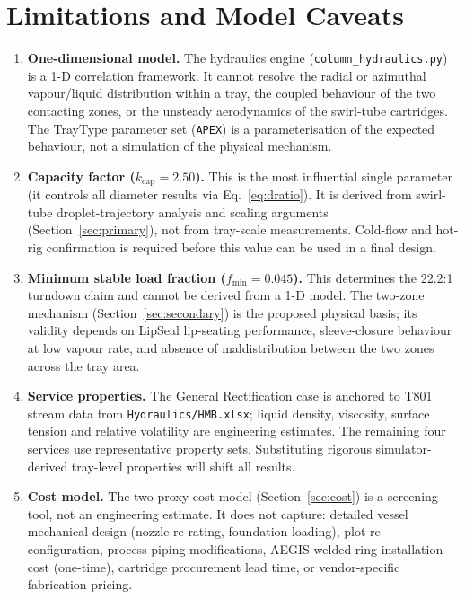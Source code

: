 \documentclass[11pt,letterpaper]{article}
\begin{document}
\section{Limitations and Model Caveats}
\label{sec:limitations}

\begin{enumerate}[nosep]
  \item \textbf{One-dimensional model.}
    The hydraulics engine (\texttt{column\_hydraulics.py}) is a 1-D correlation
    framework.  It cannot resolve the radial or azimuthal vapour/liquid
    distribution within a tray, the coupled behaviour of the two contacting
    zones, or the unsteady aerodynamics of the swirl-tube cartridges.  The
    TrayType parameter set (\texttt{APEX}) is a parameterisation of the
    expected behaviour, not a simulation of the physical mechanism.

  \item \textbf{Capacity factor ($k_{\mathrm{cap}} = 2.50$).}
    This is the most influential single parameter (it controls all
    diameter results via Eq.~\eqref{eq:dratio}).  It is derived from
    swirl-tube droplet-trajectory analysis and scaling arguments
    (Section~\ref{sec:primary}), not from tray-scale measurements.
    Cold-flow and hot-rig confirmation is required before this value can
    be used in a final design.

  \item \textbf{Minimum stable load fraction ($f_{\mathrm{min}} = 0.045$).}
    This determines the 22.2:1 turndown claim and cannot be derived from a
    1-D model.  The two-zone mechanism (Section~\ref{sec:secondary}) is the
    proposed physical basis; its validity depends on LipSeal lip-seating
    performance, sleeve-closure behaviour at low vapour rate, and absence of
    maldistribution between the two zones across the tray area.

  \item \textbf{Service properties.}
    The General Rectification case is anchored to T801 stream data from
    \texttt{Hydraulics/HMB.xlsx}; liquid density, viscosity, surface tension
    and relative volatility are engineering estimates.  The remaining four
    services use representative property sets.  Substituting rigorous
    simulator-derived tray-level properties will shift all results.

  \item \textbf{Cost model.}
    The two-proxy cost model (Section~\ref{sec:cost}) is a screening tool,
    not an engineering estimate.  It does not capture: detailed vessel
    mechanical design (nozzle re-rating, foundation loading), plot
    re-configuration, process-piping modifications, AEGIS welded-ring
    installation cost (one-time), cartridge procurement lead time, or
    vendor-specific fabrication pricing.


\end{enumerate}
\end{document}
